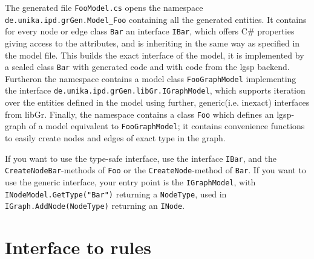 The generated file \texttt{FooModel.cs} opens the namespace \texttt{de.unika.ipd.grGen.Model\_Foo} containing all the generated entities.
It contains for every node or edge class \texttt{Bar} an interface \texttt{IBar}, which offers C\# properties giving access to the attributes, and is inheriting in the same way as specified in the model file.
This builds the exact interface of the model, it is implemented by a sealed class \texttt{Bar} with generated code and with code from the lgsp backend.
Furtheron the namespace contains a model class \texttt{FooGraphModel} implementing the interface \texttt{de.unika.ipd.grGen.libGr.IGraphModel},
which supports iteration over the entities defined in the model using further, generic(i.e. inexact) interfaces from libGr.
Finally, the namespace contains a class \texttt{Foo} which defines an lgsp-graph of a model equivalent to \texttt{FooGraphModel}; 
it contains convenience functions to easily create nodes and edges of exact type in the graph.

\begin{note}
If you want to use the type-safe interface, use the interface \texttt{IBar}, and the \texttt{CreateNodeBar}-methods of \texttt{Foo} or the \texttt{CreateNode}-method of \texttt{Bar}.
If you want to use the generic interface, your entry point is the \texttt{IGraphModel}, with \texttt{INodeModel.GetType("Bar")} returning a \texttt{NodeType}, used in \texttt{IGraph.AddNode(NodeType)} returning an \texttt{INode}.
\end{note}

\section{Interface to rules}

